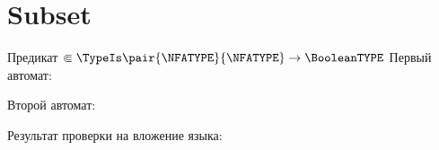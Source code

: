 \section{Subset}
\begin{frame}{Предикат $\Subset\TypeIs\pair{\NFATYPE}{\NFATYPE}\to\BooleanTYPE$}
	Первый автомат:


	Второй автомат:


	Результат проверки на вложение языка:

\end{frame}
